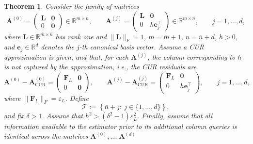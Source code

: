\documentclass[10pt,a4paper]{amsart}
\newtheorem{theorem}{Theorem}
\begin{document}
\begin{theorem}
    Consider the family of matrices
    \begin{equation}
        \mathbf{A}^{(0)}
        =
        \begin{pmatrix}
            \mathbf{L} & \mathbf{0} \\
            0          & \mathbf{0}
        \end{pmatrix}
        \in\mathbb{R}^{m\times n},
        \qquad
        \mathbf{A}^{(j)}
        =
        \begin{pmatrix}
            \mathbf{L} & \mathbf{0}         \\
            0          & h\mathbf{e}_j^\top
        \end{pmatrix}
        \in\mathbb{R}^{m\times n},
        \qquad j=1,\ldots,d,
    \end{equation}
    where $\mathbf{L}\in\mathbb{R}^{\bar m\times\bar n}$ has rank one and
    $\|\mathbf{L}\|_F=1$, $m=\bar m+1$, $n=\bar n+d$, $h>0$, and
    $\mathbf{e}_j\in\mathbb{R}^d$ denotes the $j$-th canonical basis vector.
    Assume a CUR approximation is given, and that, for each $\mathbf{A}^{(j)}$,
    the column corresponding to $h$ is not captured by the approximation, i.e.,
    the CUR residuals are
    \begin{equation}
        \mathbf{A}^{(0)}-\mathbf{A}^{(0)}_{\mathrm{CUR}}
        =
        \begin{pmatrix}
            \mathbf{F}_L & \mathbf{0} \\
            0            & \mathbf{0}
        \end{pmatrix},
        \qquad
        \mathbf{A}^{(j)}-\mathbf{A}^{(j)}_{\mathrm{CUR}}
        =
        \begin{pmatrix}
            \mathbf{F}_L & \mathbf{0}         \\
            0            & h\mathbf{e}_j^\top
        \end{pmatrix},
        \qquad j=1,\ldots,d,
    \end{equation}
    where $\|\mathbf{F}_L\|_F=\varepsilon_L$. Define
    \begin{equation}
        \mathcal{T}
        :=
        \left\{
        \bar n+j:\ j\in\{1,\ldots,d\}
        \right\},
    \end{equation}
    and fix $\delta>1$. Assume that
    $h^2>(\delta^2-1)\varepsilon_L^2$. Finally, assume that all information available to the estimator prior to its additional column queries is identical across the matrices $\mathbf{A}^{(0)}, \dots,\mathbf{A}^{(d)}$


\end{theorem}
\end{document}
